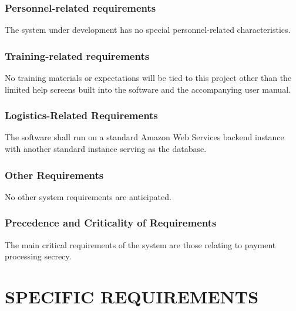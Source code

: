\documentclass[onecolumn, draftclsnofoot,10pt, compsoc]{IEEEtran}
\begin{document}
{\subsubsection[Personnel{}-related requirements]{Personnel-related requirements}

{\noindent
The system under development has no special personnel-related characteristics. }

\subsubsection[Training{}-related
requirements]{
Training-related requirements}

\noindent No training materials or expectations will be tied to this project other
than the limited help screens built into the software and the
accompanying user manual.

\subsubsection[Logistics{}-Related Requirements]{Logistics-Related Requirements}

\noindent
The software shall run on a standard Amazon Web Services backend instance with
another standard instance serving as the database.


\subsubsection[Other Requirements]{Other Requirements}

{\noindent No other system requirements are anticipated.}

\subsubsection[Precedence and Criticality of Requirements]{Precedence and Criticality of Requirements}

{\noindent The main critical requirements of the system are those relating to payment processing secrecy.}

\clearpage


\section[SPECIFIC REQUIREMENTS]{SPECIFIC REQUIREMENTS}


}
\end{document}
